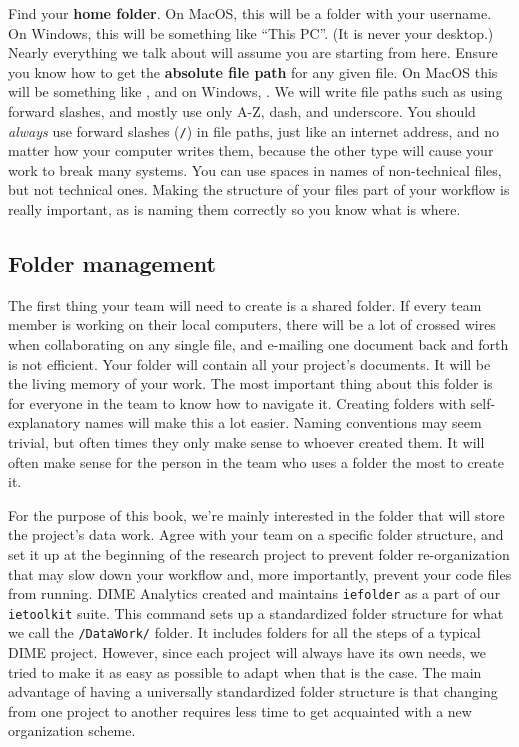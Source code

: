 Find your \textbf{home folder}. On MacOS, this will be a folder with your username.
On Windows, this will be something like ``This PC''. (It is never your desktop.)
Nearly everything we talk about will assume you are starting from here.
Ensure you know how to get the \textbf{absolute file path} for any given file.
On MacOS this will be something like ,
and on Windows, .
We will write file paths such as 
using forward slashes, and mostly use only A-Z, dash, and underscore.
You should \textit{always} use forward slashes (\texttt{/}) in file paths,
just like an internet address, and no matter how your computer writes them,
because the other type will cause your work to break many systems.
You can use spaces in names of non-technical files, but not technical ones.
Making the structure of your files part of your workflow is really important,
as is naming them correctly so you know what is where.

\subsection{Folder management}

The first thing your team will need to create is a shared folder.
If every team member is working on their local computers,
there will be a lot of crossed wires when collaborating on any single file,
and e-mailing one document back and forth is not efficient.
Your folder will contain all your project's documents.
It will be the living memory of your work.
The most important thing about this folder is for everyone in the team to know how to navigate it.
Creating folders with self-explanatory names will make this a lot easier.
Naming conventions may seem trivial,
but often times they only make sense to whoever created them.
It will often make sense for the person in the team who uses a folder the most to create it.

For the purpose of this book,
we're mainly interested in the folder that will store the project's data work.
Agree with your team on a specific folder structure, and
set it up at the beginning of the research project
to prevent folder re-organization that may slow down your workflow and,
more importantly, prevent your code files from running.
DIME Analytics created and maintains
\texttt{iefolder}
as a part of our \texttt{ietoolkit} suite.
This command sets up a standardized folder structure for what we call the \texttt{/DataWork/} folder.
It includes folders for all the steps of a typical DIME project.
However, since each project will always have its own needs,
we tried to make it as easy as possible to adapt when that is the case.
The main advantage of having a universally standardized folder structure
is that changing from one project to another requires less
time to get acquainted with a new organization scheme.

